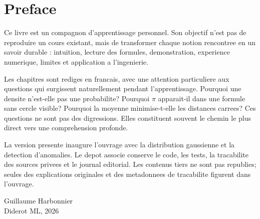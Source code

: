 \chapter*{Preface}

Ce livre est un compagnon d'apprentissage personnel. Son objectif n'est pas de
reproduire un cours existant, mais de transformer chaque notion rencontree en
un savoir durable : intuition, lecture des formules, demonstration, experience
numerique, limites et application a l'ingenierie.

Les chapitres sont rediges en francais, avec une attention particuliere aux
questions qui surgissent naturellement pendant l'apprentissage. Pourquoi une
densite n'est-elle pas une probabilite? Pourquoi $\pi$ apparait-il dans une
formule sans cercle visible? Pourquoi la moyenne minimise-t-elle les distances
carrees? Ces questions ne sont pas des digressions. Elles constituent souvent
le chemin le plus direct vers une comprehension profonde.

La version presente inaugure l'ouvrage avec la distribution gaussienne et la
detection d'anomalies. Le depot associe conserve le code, les tests, la
tracabilite des sources privees et le journal editorial. Les contenus tiers ne
sont pas republies; seules des explications originales et des metadonnees de
tracabilite figurent dans l'ouvrage.

\vspace{1em}
\begin{flushright}
Guillaume Harbonnier\\
Diderot ML, 2026
\end{flushright}

